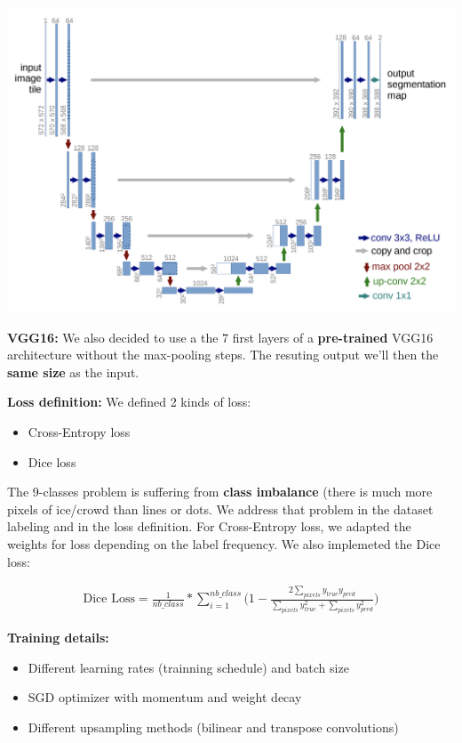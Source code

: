 \documentclass[25pt, a0paper,
               colspace=15mm, subcolspace=0mm,
               blockverticalspace=17mm]{tikzposter} %
\begin{document}
\begin{columns}
{\begin{multicols}{2}
  		\vspace{10mm}
  		{\centering \includegraphics[width=1.0\linewidth]{figures/unet-architecture.png}}
  		
  		\textbf{VGG16:} We also decided to use a the 7 first layers of a \textbf{pre-trained} VGG16 architecture without the max-pooling steps. The resuting output we'll then the \textbf{same size} as the input.
  		  		
  		\columnbreak
  		
  		\textbf{Loss definition:} We defined 2 kinds of loss:
  		\begin{itemize}
  			\item Cross-Entropy loss
  			\item Dice loss
  		\end{itemize}
  	
		The 9-classes problem is suffering from \textbf{class imbalance} (there is much more pixels of ice/crowd than lines or dots. We address that problem in the dataset labeling and in the loss definition. For Cross-Entropy loss, we adapted the weights for loss depending on the label frequency. We also implemeted the Dice loss:
		
		  \vspace{-15mm}
		\begin{gather*}
			\text{Dice Loss} = \frac{1}{nb\_class}*\sum\limits_{i=1}^{nb\_class}\Big(1-\frac{2\sum\limits_{pixels}y_{true}y_{pred}}{\sum\limits_{pixels}y_{true}^{2}+\sum\limits_{pixels}y_{pred}^{2}}\Big)
		\end{gather*}
  		
  		\textbf{Training details:}
  		
  		\vspace{-10mm}
  		\begin{itemize}
  			\item Different learning rates (trainning schedule) and batch size
  			\item SGD optimizer with momentum and weight decay
  			\item Different upsampling methods (bilinear and transpose convolutions)
  		\end{itemize}
  		

\end{multicols}}
\end{columns}
\end{document}
